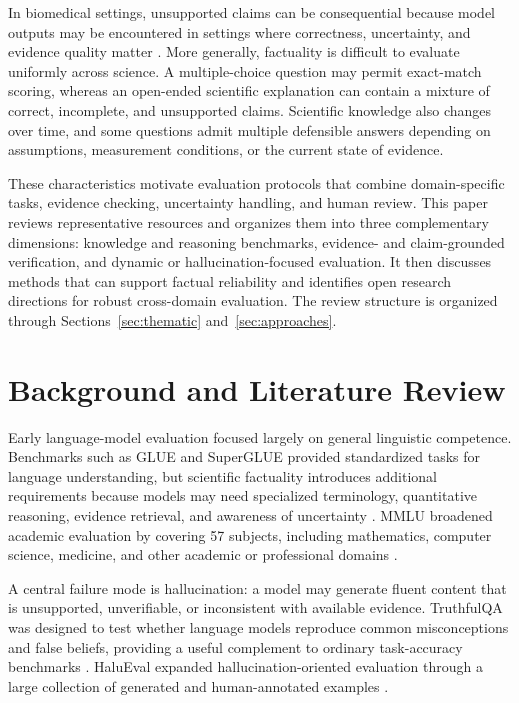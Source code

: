 \documentclass[10pt,a4paper]{article}
\begin{document}
In biomedical settings, unsupported claims can be consequential because model outputs may be encountered in settings where correctness, uncertainty, and evidence quality matter \cite{jin2019pubmedqa,singhal2023large}. More generally, factuality is difficult to evaluate uniformly across science. A multiple-choice question may permit exact-match scoring, whereas an open-ended scientific explanation can contain a mixture of correct, incomplete, and unsupported claims. Scientific knowledge also changes over time, and some questions admit multiple defensible answers depending on assumptions, measurement conditions, or the current state of evidence.

These characteristics motivate evaluation protocols that combine domain-specific tasks, evidence checking, uncertainty handling, and human review. This paper reviews representative resources and organizes them into three complementary dimensions: knowledge and reasoning benchmarks, evidence- and claim-grounded verification, and dynamic or hallucination-focused evaluation. It then discusses methods that can support factual reliability and identifies open research directions for robust cross-domain evaluation. The review structure is organized through Sections~\ref{sec:thematic} and~\ref{sec:approaches}.

\section{Background and Literature Review}\label{sec:background}

Early language-model evaluation focused largely on general linguistic competence. Benchmarks such as GLUE and SuperGLUE provided standardized tasks for language understanding, but scientific factuality introduces additional requirements because models may need specialized terminology, quantitative reasoning, evidence retrieval, and awareness of uncertainty \cite{wang2018glue,wang2019superglue}. MMLU broadened academic evaluation by covering 57 subjects, including mathematics, computer science, medicine, and other academic or professional domains \cite{hendrycks2021mmlu}.

A central failure mode is hallucination: a model may generate fluent content that is unsupported, unverifiable, or inconsistent with available evidence. TruthfulQA was designed to test whether language models reproduce common misconceptions and false beliefs, providing a useful complement to ordinary task-accuracy benchmarks \cite{lin2022truthfulqa}. HaluEval expanded hallucination-oriented evaluation through a large collection of generated and human-annotated examples \cite{li2023halueval}.
\end{document}
